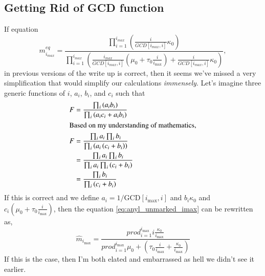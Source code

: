 \documentclass[review]{elsarticle}
\newcommand{\imax}{\ensuremath{i_{\max}}\xspace}
\newcommand{\GCD}{\ensuremath{\text{GCD}}\xspace}
\begin{document}
\subsection*{Getting Rid of GCD function}
If equation
\begin{equation}\label{eq:anyl_unmarked_imax}
m_{i_{max}}^{eq}=\dfrac{\prod_{i=1}^{i_{max}}\left(\frac{i}{GCD[i_{max},i]}\kappa_0\right)}{\prod_{i=1}^{i_{max}}\left(\frac{i_{max}}{GCD[i_{max},i]}(\mu_0+\tau_0\frac{i}{\imax})+\frac{i}{GCD[i_{max},i]}\kappa_0\right)},
\end{equation}
 in previous versions of the write up is correct, then it seems we've missed a very simplification that would simplify our calculations \emph{immensely}.
Let's imagine three generic functions of $i$, $a_i$, $b_i$, and $c_i$ such that
\begin{align}
  F &= \frac{ \prod_i \left(a_i b_i\right)}{\prod_i \left(a_i c_i + a_i b_i\right)}\\
\intertext{Based on my understanding of mathematics,}
  F &= \frac{ \prod_i a_i \prod_i b_i }{\prod_i \left(a_i \left(c_i + b_i\right)\right)}\\
  &= \frac{ \prod_i a_i \prod_i b_i }{\prod_i a_i \prod_i \left(c_i + b_i\right)}\\
  &= \frac{\prod_i b_i }{\prod_i \left(c_i + b_i\right)}\\
\end{align}
If this is correct and we define $a_i = 1/\GCD[\imax, i]$ and $b_i \kappa_0$ and $c_i (\mu_0 + \tau_0\frac{i}{\imax})$, then the equation \ref{eq:anyl_unmarked_imax} can be rewritten as,
\begin{equation}
  \hat{m}_{\imax}= \frac{ prod_{i=1}^{\imax} i \frac{\kappa_0}{\imax}}{prod_{i=1}^{\imax} \mu_0 + \left(\tau_0\frac{i}{\imax} +\frac{\kappa_0}{\imax}\right)} 
\end{equation}
If this is the case, then I'm both elated and embarrassed as hell we didn't see it earlier.
\end{document}
